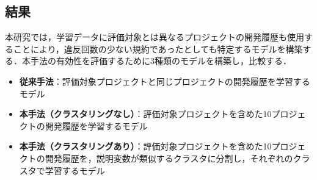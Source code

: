 \documentclass[T,J]{fose} %
\begin{document}
\subsection{結果}

本研究では，学習データに評価対象とは異なるプロジェクトの開発履歴も使用することにより，違反回数の少ない規約であったとしても特定するモデルを構築する．本手法の有効性を評価するために3種類のモデルを構築し，比較する．
\begin{itemize}
\item \textbf{従来手法}：評価対象プロジェクトと同じプロジェクトの開発履歴を学習するモデル
\item \textbf{本手法（クラスタリングなし）}：評価対象プロジェクトを含めた10プロジェクトの開発履歴を学習するモデル
\item \textbf{本手法（クラスタリングあり）}：評価対象プロジェクトを含めた10プロジェクトの開発履歴を，説明変数が類似するクラスタに分割し，それぞれのクラスタで学習するモデル
\end{itemize}
\end{document}
